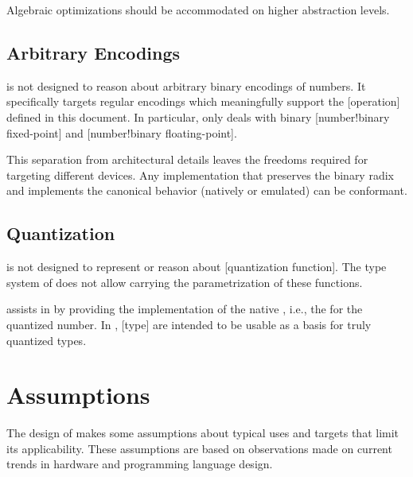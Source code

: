 \begin{highlight}{}
    Algebraic optimizations should be accommodated on higher abstraction levels.
\end{highlight}

\subsection{Arbitrary Encodings}
\label{goal:bit_encoding}

\basetwo is not designed to reason about arbitrary binary encodings of numbers.
It specifically targets regular encodings which meaningfully support the [operation] defined in this document.
In particular, \basetwo only deals with binary [number!binary fixed-point] and [number!binary floating-point].

\begin{highlight}{}
    This separation from architectural details leaves the freedoms required for targeting different devices.
    Any implementation that preserves the binary radix and implements the canonical behavior (natively or emulated) can be conformant.
\end{highlight}

\subsection{Quantization}
\label{goal:quantization}

\basetwo is not designed to represent or reason about [quantization function].
The type system of \basetwo does not allow carrying the parametrization of these functions.

\begin{highlight}{}
    \basetwo assists in  by providing the implementation of the native , i.e., the  for the quantized number.
    In \MLIR, \basetwo {}[type] are intended to be usable as a basis for truly quantized types.
\end{highlight}

\section{Assumptions}

The design of \basetwo makes some assumptions about typical uses and targets that limit its applicability.
These assumptions are based on observations made on current trends in hardware and programming language design.

